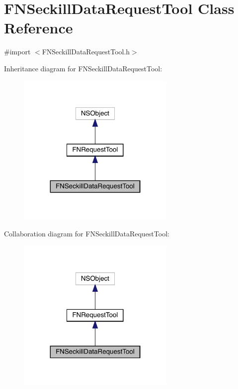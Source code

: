 \hypertarget{interface_f_n_seckill_data_request_tool}{}\section{F\+N\+Seckill\+Data\+Request\+Tool Class Reference}
\label{interface_f_n_seckill_data_request_tool}


{\ttfamily \#import $<$F\+N\+Seckill\+Data\+Request\+Tool.\+h$>$}



Inheritance diagram for F\+N\+Seckill\+Data\+Request\+Tool\+:\nopagebreak
\begin{figure}[H]
\begin{center}
\leavevmode
\includegraphics[width=215pt]{interface_f_n_seckill_data_request_tool__inherit__graph}
\end{center}
\end{figure}


Collaboration diagram for F\+N\+Seckill\+Data\+Request\+Tool\+:\nopagebreak
\begin{figure}[H]
\begin{center}
\leavevmode
\includegraphics[width=215pt]{interface_f_n_seckill_data_request_tool__coll__graph}
\end{center}
\end{figure}
